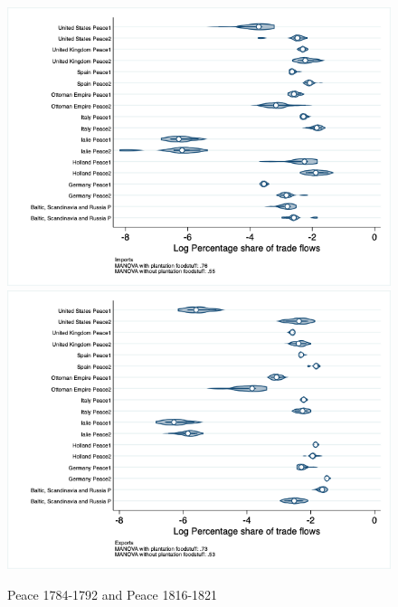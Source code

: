 \documentclass[12pt,a4paper,notitlepage,english]{article}
\begin{document}
\begin{appendix}
\begin{figure}[h!]
\centering
\caption{Peace 1784-1792 and Peace 1816-1821}
\label{peace1784_1792_peace1816_1821_nat_distr_pays7}
\includegraphics[scale=.4]{peace1784_1792_peace1816_1840_nat_distr_Ipays7}
\includegraphics[scale=.4]{peace1784_1792_peace1816_1840_nat_distr_Xpays7}
\end{figure}


\end{appendix}
\end{document}

